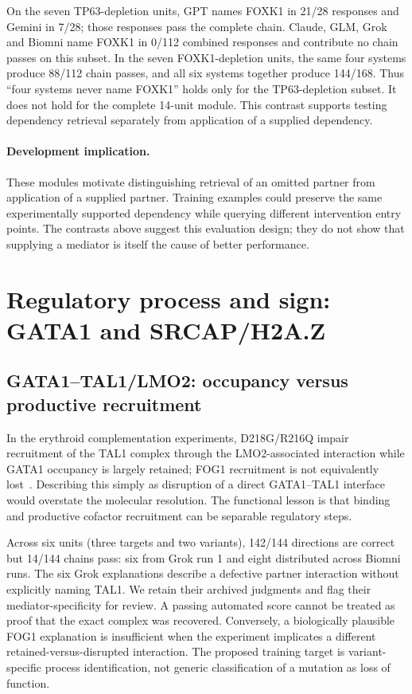 On the seven TP63-depletion units, GPT names FOXK1 in 21/28 responses and Gemini in 7/28; those responses pass the complete chain. Claude, GLM, Grok and Biomni name FOXK1 in 0/112 combined responses and contribute no chain passes on this subset. In the seven FOXK1-depletion units, the same four systems produce 88/112 chain passes, and all six systems together produce 144/168. Thus ``four systems never name FOXK1'' holds only for the TP63-depletion subset. It does not hold for the complete 14-unit module. This contrast supports testing dependency retrieval separately from application of a supplied dependency.

\paragraph{Development implication.} These modules motivate distinguishing retrieval of an omitted partner from application of a supplied partner. Training examples could preserve the same experimentally supported dependency while querying different intervention entry points. The contrasts above suggest this evaluation design; they do not show that supplying a mediator is itself the cause of better performance.

\clearpage
\section{Regulatory process and sign: GATA1 and SRCAP/H2A.Z}\label{app:function}
\subsection{GATA1--TAL1/LMO2: occupancy versus productive recruitment}
In the erythroid complementation experiments, D218G/R216Q impair recruitment of the TAL1 complex through the LMO2-associated interaction while GATA1 occupancy is largely retained; FOG1 recruitment is not equivalently lost~\cite{campbell2013gata1}. Describing this simply as disruption of a direct GATA1--TAL1 interface would overstate the molecular resolution. The functional lesson is that binding and productive cofactor recruitment can be separable regulatory steps.

Across six units (three targets and two variants), 142/144 directions are correct but 14/144 chains pass: six from Grok run 1 and eight distributed across Biomni runs. The six Grok explanations describe a defective partner interaction without explicitly naming TAL1. We retain their archived judgments and flag their mediator-specificity for review. A passing automated score cannot be treated as proof that the exact complex was recovered. Conversely, a biologically plausible FOG1 explanation is insufficient when the experiment implicates a different retained-versus-disrupted interaction. The proposed training target is variant-specific process identification, not generic classification of a mutation as loss of function.

